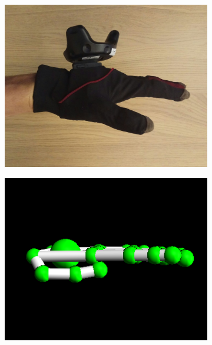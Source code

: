 \documentclass[hyperref, bachelorofscience]{cgvpub}
\begin{document}
\begin{figure}
	\begin{subfigure}{.235\linewidth}
		\includegraphics[width=\linewidth]{../pics/hand_radial_flat}
	\end{subfigure}
	\vspace{.1cm}
	\hspace{.01cm}
	\begin{subfigure}{.235\linewidth}
		\includegraphics[width=\linewidth]{../pics/model_radial_flat}
	\end{subfigure}
	\hfill
	\begin{subfigure}{.235\linewidth}

\end{subfigure}
\end{figure}
\end{document}
